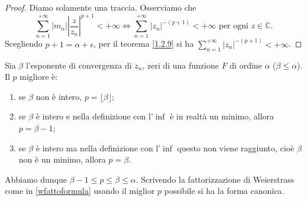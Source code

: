 \begin{proof}
  Diamo solamente una traccia. Osserviamo che
  $$\sum_{n=1}^{+\infty} |m_n|\left|\frac{z}{z_n}\right|^{p+1}<+\infty \iff \sum_{n=1}^{+\infty} |z_n|^{-(p+1)}<+\infty\text{ per ogni }z \in \mathbb{C}.$$
  Scegliendo $p+1=\alpha+\epsilon$, per il teorema \ref{1.2.9} si ha $\displaystyle \sum_{n=1}^{+\infty} |z_n|^{-(p+1)}<+\infty$.
\end{proof}

\begin{oss}
  Sia $\beta$ l'esponente di convergenza di $z_n$, zeri di una funzione $F$ di ordine $\alpha$ ($\beta \le \alpha$). Il $p$ migliore è:
  \begin{enumerate}
    \item se $\beta$ non è intero, $p=\lfloor\beta\rfloor$;
    \item se $\beta$ è intero e nella definizione con l'$\inf$ è in realtà un minimo, allora $p=\beta-1$;
    \item se $\beta$ è intero ma nella definizione con l'$\inf$ questo non viene raggiunto, cioè $\beta$ non è un minimo, allora $p=\beta$.
  \end{enumerate}
  Abbiamo dunque $\beta-1 \le p \le \beta \le \alpha$. Scrivendo la fattorizzazione di Weierstrass come in \eqref{wfattoformula} usando il miglior $p$ possibile si ha la forma canonica.
\end{oss}
